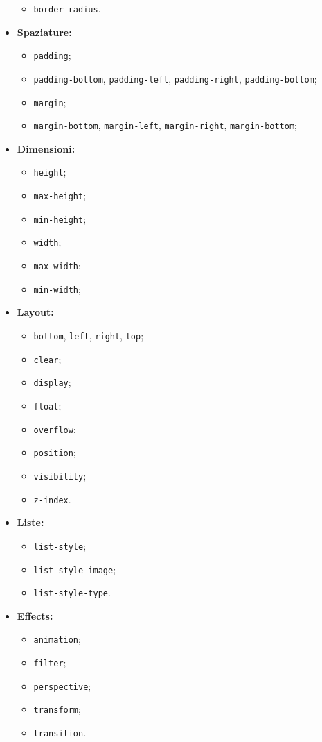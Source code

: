 \documentclass[a4paper,11pt]{article}
\begin{document}
\begin{itemize}
\begin{itemize}
			\item \lstinline|border-radius|.
		\end{itemize}
	\item \textbf{Spaziature:}
		\begin{itemize}
			\item \lstinline|padding|;
			\item \lstinline|padding-bottom|, \lstinline|padding-left|, \lstinline|padding-right|, \lstinline|padding-bottom|;
			\item \lstinline|margin|;
			\item \lstinline|margin-bottom|, \lstinline|margin-left|, \lstinline|margin-right|, \lstinline|margin-bottom|;
		\end{itemize}
	\item \textbf{Dimensioni:}
		\begin{itemize}
			\item \lstinline|height|;
			\item \lstinline|max-height|;
			\item \lstinline|min-height|;
			\item \lstinline|width|;
			\item \lstinline|max-width|;
			\item \lstinline|min-width|;
		\end{itemize}
	\item \textbf{Layout:}
		\begin{itemize}
			\item \lstinline|bottom|, \lstinline|left|, \lstinline|right|, \lstinline|top|;
			\item \lstinline|clear|;
			\item \lstinline|display|;
			\item \lstinline|float|;
			\item \lstinline|overflow|;
			\item \lstinline|position|;
			\item \lstinline|visibility|;
			\item \lstinline|z-index|.
		\end{itemize}
	\item \textbf{Liste:}
		\begin{itemize}
			\item \lstinline|list-style|;
			\item \lstinline|list-style-image|;
			\item \lstinline|list-style-type|.
		\end{itemize}
	\item \textbf{Effects:}
		\begin{itemize}
			\item \lstinline|animation|;
			\item \lstinline|filter|;
			\item \lstinline|perspective|;
			\item \lstinline|transform|;
			\item \lstinline|transition|.
		\end{itemize}
\end{itemize}
\end{document}
